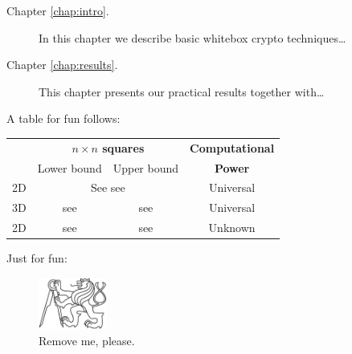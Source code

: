 	\begin{description}
		\item[Chapter \ref{chap:intro}.] In this chapter we describe basic whitebox crypto techniques\ldots
		\item[Chapter \ref{chap:results}.] This chapter presents our practical results together with\ldots
	\end{description}


A table for fun follows:
\begin{center}
\begin{tabular}{|| c || c | c | c ||}
	\hline\hline
	~ & \multicolumn{2}{c|}{\bf $n\times n$ squares} & {\bf Computational} \\
	~ & \multicolumn{1}{c}{Lower bound} & \multicolumn{1}{c|}{Upper bound} & {\bf Power}\\
	\hline
	2D & \multicolumn{2}{c|}{See see} & Universal \\
	\hline
	3D & see & see & Universal \\
	\hline
	2D & see & see & Unknown \\
	\hline\hline
\end{tabular}
\end{center}

Just for fun:
\begin{figure}[H]
\begin{center}
	\includegraphics[width=0.2\textwidth]{./figures/fig.pdf} %
	\caption{Remove me, please.}
	\label{fig:3color}
\end{center}
\end{figure}

